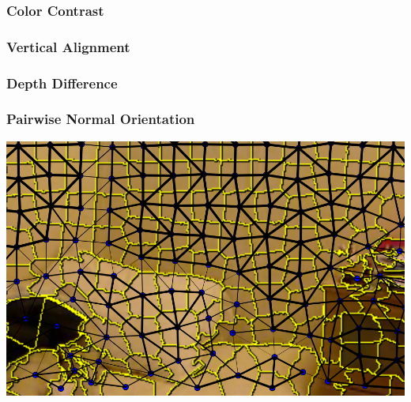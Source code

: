 \documentclass[final,ignorenonframetext,compress]{beamer}
\begin{document}
    \begin{frame}
        \frametitle{Color Contrast}
    \end{frame}

    \begin{frame}
        \frametitle{Vertical Alignment}
    \end{frame}

    \begin{frame}
        \frametitle{Depth Difference}
    \end{frame}
    

    \begin{frame}
        \frametitle{Pairwise Normal Orientation}
        \includegraphics[width=\linewidth]{images/normal_feature}
    \end{frame}
\end{document}
